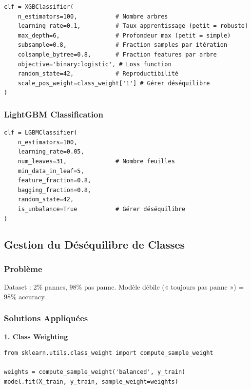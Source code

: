 \documentclass[12pt,a4paper,french]{article}
\begin{document}
\begin{lstlisting}
clf = XGBClassifier(
    n_estimators=100,           # Nombre arbres
    learning_rate=0.1,          # Taux apprentissage (petit = robuste)
    max_depth=6,                # Profondeur max (petit = simple)
    subsample=0.8,              # Fraction samples par itération
    colsample_bytree=0.8,       # Fraction features par arbre
    objective='binary:logistic', # Loss function
    random_state=42,            # Reproductibilité
    scale_pos_weight=class_weight['1'] # Gérer déséquilibre
)
\end{lstlisting}

\subsubsection{LightGBM Classification}

\begin{lstlisting}
clf = LGBMClassifier(
    n_estimators=100,
    learning_rate=0.05,
    num_leaves=31,              # Nombre feuilles
    min_data_in_leaf=5,
    feature_fraction=0.8,
    bagging_fraction=0.8,
    random_state=42,
    is_unbalance=True           # Gérer déséquilibre
)
\end{lstlisting}

\subsection{Gestion du Déséquilibre de Classes}

\subsubsection{Problème}

Dataset : 2\% pannes, 98\% pas panne. Modèle débile (« toujours pas panne ») = 98\% accuracy.

\subsubsection{Solutions Appliquées}

\textbf{1. Class Weighting}

\begin{lstlisting}
from sklearn.utils.class_weight import compute_sample_weight

weights = compute_sample_weight('balanced', y_train)
model.fit(X_train, y_train, sample_weight=weights)
\end{lstlisting}
\end{document}
